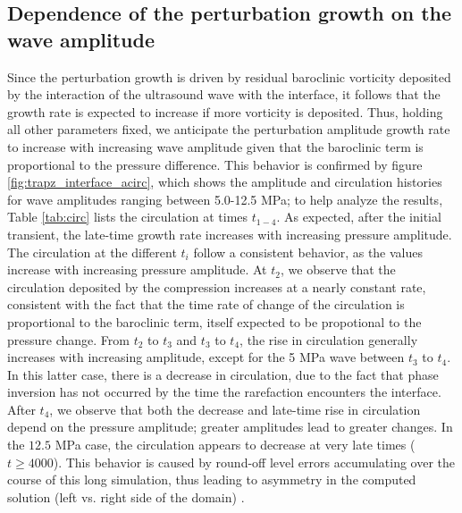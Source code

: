 %
%


\subsection{Dependence of the perturbation growth on the wave amplitude}

Since the perturbation growth is driven by residual baroclinic
vorticity deposited by the interaction of the ultrasound wave with the
interface, it follows that the growth rate is expected to increase if
more vorticity is deposited. Thus, holding all other parameters fixed,
we anticipate the perturbation amplitude growth rate to increase with
increasing wave amplitude given that the baroclinic term is
proportional to the pressure difference. This behavior is confirmed by
figure \ref{fig:trapz_interface_acirc}, which shows the amplitude
and circulation histories for wave amplitudes ranging between 5.0-12.5
MPa; to help analyze the results, Table \ref{tab:circ} lists the
circulation at times $t_{1-4}$.  As expected, after the initial
transient, the late-time growth rate increases with increasing
pressure amplitude.  The circulation at the different $t_i$ follow a
consistent behavior, as the values increase with increasing pressure
amplitude. At $t_2$, we observe that the circulation deposited by the
compression increases at a nearly constant rate, consistent with the
fact that the time rate of change of the circulation is proportional
to the baroclinic term, itself expected to be propotional to the
pressure change. From $t_2$ to $t_3$ and $t_3$ to $t_4$, the rise in
circulation generally increases with increasing amplitude, except for
the 5 MPa wave between $t_3$ to $t_4$. In this latter case, there is a
decrease in circulation, due to the fact that phase inversion has not
occurred by the time the rarefaction encounters the interface.  After
$t_4$, we observe that both the decrease and late-time rise in
circulation depend on the pressure amplitude; greater amplitudes lead
to greater changes.  In the $12.5$ MPa case, the circulation appears
to decrease at very late times ($t\geq4000$). This behavior is caused
by round-off level errors accumulating over the course of this long
simulation, thus leading to asymmetry in the computed solution (left
vs. right side of the domain) \citep{Movahed2013}.

